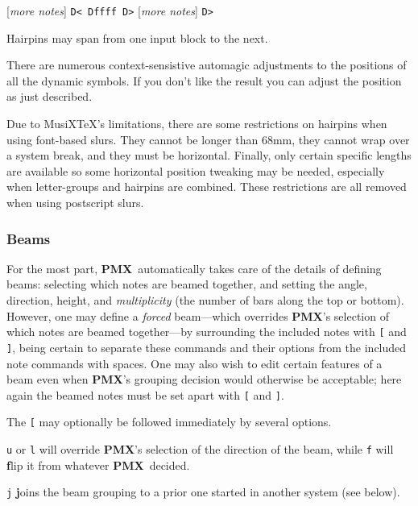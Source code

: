 \documentclass[11pt]{article}
\def\MusiXTeX{MusiX\TeX}
\newcommand\PMXX{\textbf{PMX}}
\newcommand\PMX{\PMXX~}
\def\newfrom{2.59}  %
\def\NEW#1{\ifdim#1 pt<\newfrom pt\else%
\marginpar{\fbox{#1}}\fi}
\begin{document}
 [{\it more notes}] {\tt D< Dffff D>} 
[{\it more notes}] {\tt D>}
\medskip
 
Hairpins \NEW{2.7} may span from one input block to the next.  

There are numerous context-sensistive automagic adjustments to the positions 
of all the dynamic symbols.  If you don't like the result you can adjust the
position as just described. 

Due to \MusiXTeX's limitations, 
there are some restrictions on hairpins when using font-based slurs.
They cannot be longer than 68mm, they cannot wrap over a system break, and they
must be horizontal. Finally, 
only certain specific lengths are available so some horizontal position
tweaking may be needed, especially when letter-groups and 
hairpins are combined.
These restrictions are all removed when using postscript slurs.

\subsubsection{Beams} \label{beams}

	For the most part, \PMX automatically takes care of the details of 
defining beams: selecting which notes are beamed together, and setting 
the angle, direction, height, and {\it multiplicity} (the number of bars 
along the top or bottom).  However, one may define a {\it forced} 
beam---which overrides \PMXX 's selection of which notes are beamed 
together---by 
surrounding the included notes with {\tt [} and {\tt ]}, being certain to 
separate these commands and their options from the included note commands with
spaces.  One may also wish to edit certain features of a beam even when 
\PMXX 's grouping decision 
would otherwise be acceptable; here again the beamed notes must be set 
apart with {\tt [} and {\tt ]}.  

The {\tt [} may optionally be followed 
immediately by several options. 

{\tt u} or {\tt l} will override 
\PMXX 's selection of the direction of the beam, while {\tt f} will
{\bf f}lip it from whatever \PMX decided. 

{\tt j} {\bf j}oins the beam
grouping to a prior one started in another system (see below).  
\end{document}
